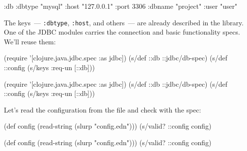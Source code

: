 
\begin{english}
  \begin{clojure}
{:db {:dbtype "mysql"
      :host "127.0.0.1"
      :port 3306
      :dbname "project"
      :user "user"}}
  \end{clojure}
\end{english}

The keys~--- \verb|:dbtype|, \verb|:host|, and others~--- are already described in the library. One of the JDBC modules carries the connection and basic functionality specs. We'll reuse them:

\ifx\DEVICETYPE\MOBILE

\begin{english}
  \begin{clojure}
(require
  '[clojure.java.jdbc.spec :as jdbc])
(s/def ::db ::jdbc/db-spec)
(s/def ::config (s/keys :req-un [::db]))
  \end{clojure}
\end{english}

\else

\begin{english}
  \begin{clojure}
(require '[clojure.java.jdbc.spec :as jdbc])
(s/def ::db ::jdbc/db-spec)
(s/def ::config (s/keys :req-un [::db]))
  \end{clojure}
\end{english}

\fi

\noindent
Let's read the configuration from the file and check with the spec:

\ifx\DEVICETYPE\MOBILE

\begin{english}
  \begin{clojure}
(def config
  (read-string (slurp "config.edn")))
(s/valid? ::config config)
  \end{clojure}
\end{english}

\else

\begin{english}
  \begin{clojure}
(def config (read-string (slurp "config.edn")))
(s/valid? ::config config)
  \end{clojure}
\end{english}

\fi

\label{jdbc-conform-warning}

